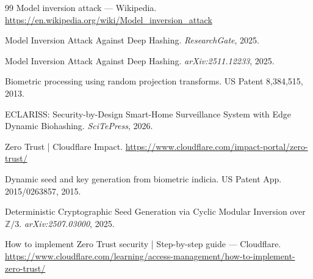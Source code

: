\documentclass[11pt,twoside]{amsart}
\theoremstyle{plain}
\theoremstyle{definition}
\theoremstyle{remark}
\newcommand{\bbZ}{\mathbb{Z}}
\begin{document}
\begin{thebibliography}{99}
Model inversion attack --- Wikipedia.
\url{https://en.wikipedia.org/wiki/Model_inversion_attack}

Model Inversion Attack Against Deep Hashing.
\textit{ResearchGate}, 2025.

Model Inversion Attack Against Deep Hashing.
\textit{arXiv:2511.12233}, 2025.

Biometric processing using random projection transforms.
US Patent 8,384,515, 2013.

ECLARISS: Security-by-Design Smart-Home Surveillance System with Edge Dynamic Biohashing.
\textit{SciTePress}, 2026.

Zero Trust | Cloudflare Impact.
\url{https://www.cloudflare.com/impact-portal/zero-trust/}

Dynamic seed and key generation from biometric indicia.
US Patent App. 2015/0263857, 2015.

Deterministic Cryptographic Seed Generation via Cyclic Modular Inversion over $\bbZ/3$.
\textit{arXiv:2507.03000}, 2025.

How to implement Zero Trust security | Step-by-step guide --- Cloudflare.
\url{https://www.cloudflare.com/learning/access-management/how-to-implement-zero-trust/}

\end{thebibliography}
\end{document}

